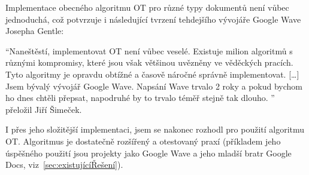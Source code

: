 Implementace obecného algoritmu \gls{OT} pro různé typy dokumentů není vůbec jednoduchá, což potvrzuje i následující tvrzení tehdejšího vývojáře Google Wave Josepha Gentle:

\enquote{Naneštěstí, implementovat OT není vůbec veselé.
Existuje milion algoritmů s různými kompromisy, které jsou však většinou uvězněny ve věděckých pracích.
Tyto algoritmy je opravdu obtížné a časově náročné správně implementovat.
[\ldots]
Jsem bývalý vývojář Google Wave.
Napsání Wave trvalo 2 roky a pokud bychom ho dnes chtěli přepsat, napodruhé by to trvalo téměř stejně tak dlouho.
}~\cite{ot:sharejs} přeložil Jiří Šimeček.

I přes jeho složitější implementaci, jsem se nakonec rozhodl pro použití algoritmu \gls{OT}.
Algoritmus je dostatečně rozšířený a otestovaný praxí (příkladem jeho úspěšného použití jsou projekty jako Google Wave a jeho mladší bratr Google Docs, viz~\ref{sec:existujícíŘešení}).
